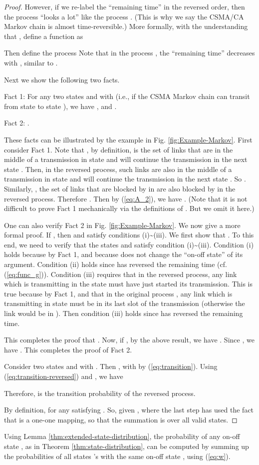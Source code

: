 \documentclass{IEEEtran}
\begin{document}
\begin{proof}
However, if we re-label the {}``remaining time'' in the reversed
order, then the process  {}``looks a lot'' like
the process . (This is why we say the CSMA/CA Markov chain
is almost time-reversible.) More formally, with the understanding
that , define a function
 as 


Then define the process 
Note that in the process , the {}``remaining time''
decreases with , similar to . 

Next we show the following two facts.

Fact 1: For any two states  and  with  (i.e.,
if the CSMA Markov chain can transit from state  to state ),
we have , 
and . 

Fact 2: .

These facts can be illustrated by the example in Fig. \ref{fig:Example-Markov}.
First consider Fact 1. Note that , by definition,
is the set of links that are in the middle of a transmission in state
 and will continue the transmission in the next state . Then,
in the reversed process, such links are also in the middle of a transmission
in state  and will continue the transmission in the next state
. So . Similarly, ,
the set of links that are blocked by  in  are also
blocked by  in the reversed process. Therefore .
Then by (\ref{eq:A_2}), we have . (Note that
it is not difficult to prove Fact 1 mechanically via the definitions
of . But we omit it here.) 

One can also verify Fact 2 in Fig. \ref{fig:Example-Markov}. We now
give a more formal proof. If , then  and  satisfy
conditions (i)\textasciitilde{}(iii). We first show that .
To this end, we need to verify that the states  and 
satisfy condition (i)\textasciitilde{}(iii). Condition (i) holds because
 by Fact 1, and because 
does not change the {}``on-off state'' of its argument. Condition
(ii) holds since  has reversed the remaining time (cf.
(\ref{eq:func_g})). Condition (iii) requires that in the reversed
process, any link  which is transmitting in the
state  must have just started its transmission. This is true
because  by Fact 1, and that in the original
process , any link  which is transmitting in
state  must be in its last slot of the transmission (otherwise
the link would be in ). Then condition (iii) holds since
 has reversed the remaining time.

This completes the proof that .
Now, if , by the above result, we have .
Since , we have . This completes
the proof of Fact 2.

Consider two states  and  with . Then ,
with 
by (\ref{eq:transition}). Using (\ref{eq:transition-reversed}) and
, we have 


Therefore,  is the transition probability of the
reversed process. 

By definition,  for any  satisfying .
So, given ,
where the last step has used the fact that  is a one-one
mapping, so that the summation is over all valid states.
\end{proof}
\medskip{}
Using Lemma \ref{thm:extended-state-distribution}, the probability
of any on-off state , as in Theorem \ref{thm:state-distribution},
can be computed by summing up the probabilities of all states 's
with the same on-off state , using (\ref{eq:w}). 
\end{document}
